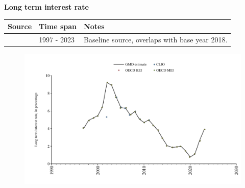 \documentclass[12pt,a4paper,landscape]{article}
\begin{document}
\begin{adjustbox}{max totalsize={\paperwidth}{\paperheight},center}
\begin{minipage}[t][\textheight][t]{\textwidth}
\vspace*{0.5cm}
{}
\begin{center}
{\Large\bfseries Long term interest rate}
\end{center}
\vspace{0.5cm}
\begin{table}[H]
\centering
\small
\begin{tabular}{|l|l|l|}
\hline
\textbf{Source} & \textbf{Time span} & \textbf{Notes} \\
\hline
\rowcolor{white}\cite{OECD_MEI}& 1997 - 2023 &Baseline source, overlaps with base year 2018. \\
\hline
\end{tabular}
\end{table}
\begin{figure}[H]
\centering
\includegraphics[width=\textwidth,height=0.6\textheight,keepaspectratio]{graphs/ISR_ltrate.pdf}
\end{figure}
\end{minipage}
\end{adjustbox}
\end{document}
